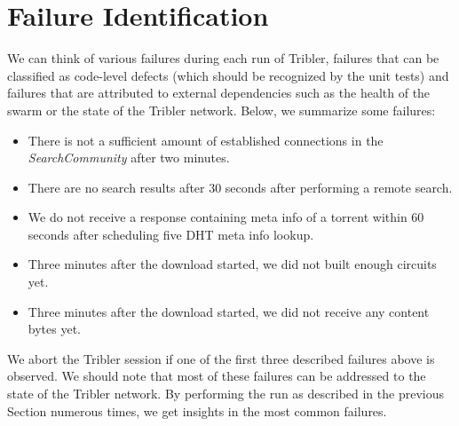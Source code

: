 \section{Failure Identification}
We can think of various failures during each run of Tribler, failures that can be classified as code-level defects (which should be recognized by the unit tests) and failures that are attributed to external dependencies such as the health of the swarm or the state of the Tribler network. Below, we summarize some failures:
\begin{itemize}
	\item There is not a sufficient amount of established connections in the \emph{SearchCommunity} after two minutes.
	\item There are no search results after 30 seconds after performing a remote search.
	\item We do not receive a response containing meta info of a torrent within 60 seconds after scheduling five DHT meta info lookup.
	\item Three minutes after the download started, we did not built enough circuits yet.
	\item Three minutes after the download started, we did not receive any content bytes yet.
\end{itemize}
We abort the Tribler session if one of the first three described failures above is observed. We should note that most of these failures can be addressed to the state of the Tribler network. By performing the run as described in the previous Section numerous times, we get insights in the most common failures.



